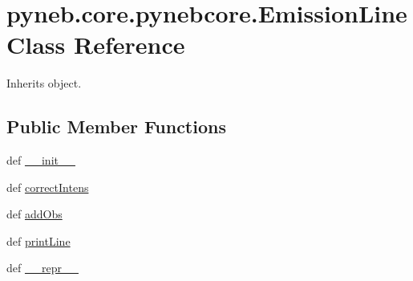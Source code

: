 \hypertarget{classpyneb_1_1core_1_1pynebcore_1_1_emission_line}{\section{pyneb.\-core.\-pynebcore.\-Emission\-Line Class Reference}
\label{classpyneb_1_1core_1_1pynebcore_1_1_emission_line}
}


Inherits object.

\subsection*{Public Member Functions}
\begin{DoxyCompactItemize}
\item 
def \hyperlink{classpyneb_1_1core_1_1pynebcore_1_1_emission_line_a4966db926181349d90594f0b6d170c45}{\-\_\-\-\_\-init\-\_\-\-\_\-}
\item 
def \hyperlink{classpyneb_1_1core_1_1pynebcore_1_1_emission_line_a7e915a1443ed01912b44052900b2e581}{correct\-Intens}
\item 
def \hyperlink{classpyneb_1_1core_1_1pynebcore_1_1_emission_line_a1669e4e38ca70d04d3a1395bd6bf237e}{add\-Obs}
\item 
def \hyperlink{classpyneb_1_1core_1_1pynebcore_1_1_emission_line_a30c40fa492a3b74ad4c85b07f89fab25}{print\-Line}
\item 
def \hyperlink{classpyneb_1_1core_1_1pynebcore_1_1_emission_line_a0765acf2ba023a1e5fa5833a7a108635}{\-\_\-\-\_\-repr\-\_\-\-\_\-}
\end{DoxyCompactItemize}
